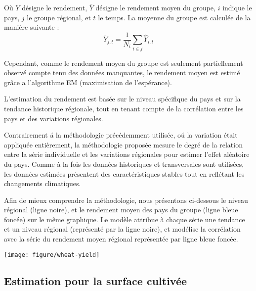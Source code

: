 \documentclass[nojss]{jss}\usepackage{graphicx, color}
\makeatletter
\def\maxwidth{ %
  \ifdim\Gin@nat@width>\linewidth
    \linewidth
  \else
    \Gin@nat@width
  \fi
}
\newenvironment{knitrout}{}{} %
\makeatother
\begin{document}
O\`{u} $Y$ d\'{e}signe le rendement, $\bar{Y}$ d\'{e}signe le rendement
moyen du groupe, $i$ indique le pays, $j$ le groupe r\'{e}gional, et
$t$ le temps. La moyenne du groupe est calcul\'{e}e de la mani\`{e}re
suivante :
\begin{equation}
  \label{eq:averageYield}
  \bar{Y}_{j, t} = \frac{1}{N_i}\sum_{i \in j} \hat{Y}_{i,t}
\end{equation}

Cependant, comme le rendement moyen du groupe est seulement
partiellement observ\'{e} compte tenu des donn\'{e}es manquantes, le
rendement moyen est estim\'{e} gr\^{a}ce a l'algorithme EM (maximisation
de l'esp\'{e}rance).

L'estimation du rendement est bas\'{e}e sur le niveau sp\'{e}cifique
du pays et sur la tendance historique r\'{e}gionale, tout en tenant
compte de la corr\'{e}lation entre les pays et des variations
r\'{e}gionales.

Contrairement \'{a} la m\'{e}thodologie pr\'{e}c\'{e}demment
utilis\'{e}e, o\'{u} la variation \'{e}tait appliqu\'{e}e
enti\`{e}rement, la m\'{e}thodologie propos\'{e}e mesure le degr\'{e}
de la relation entre la s\'{e}rie individuelle et les variations
r\'{e}gionales pour estimer l'effet al\'{e}atoire du pays. Comme \`{a}
la fois les donn\'{e}es historiques et transversales sont
utilis\'{e}es, les donn\'{e}es estim\'{e}es pr\'{e}sentent des
caract\'{e}ristiques stables tout en refl\'{e}tant les changements
climatiques.


Afin de mieux comprendre la m\'{e}thodologie, nous pr\'{e}sentons
ci-dessous le niveau r\'{e}gional (ligne noire), et le rendement moyen
des pays du groupe (ligne bleue fonc\'{e}e) sur le m\^{e}me
graphique. Le mod\`{e}le attribue \`{a} chaque s\'{e}rie une tendance
et un niveau r\'{e}gional (repr\'{e}sent\'{e} par la ligne noire), et
mod\'{e}lise la corr\'{e}lation avec la s\'{e}rie du rendement moyen
r\'{e}gional repr\'{e}sent\'{e}e par ligne bleue fonc\'{e}e.


\begin{knitrout}
\color{fgcolor}

{\centering \texttt{[image: figure/wheat-yield]} 

}



\end{knitrout}




\subsection{Estimation pour la surface cultiv\'{e}e }
\end{document}
